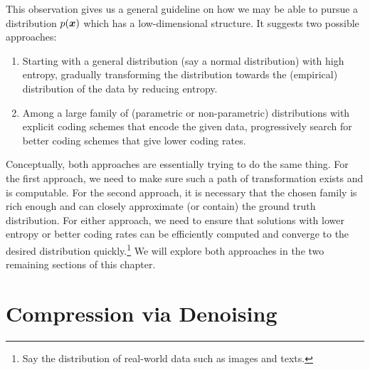 \documentclass[../../book-main.tex]{subfiles}
\begin{document}
This observation gives us a general guideline on how we may be able to pursue a distribution $p(\bm{x})$ which has a low-dimensional structure. It suggests two possible approaches:
\begin{enumerate}
	\item Starting with a general distribution (say a normal distribution) with high entropy, gradually transforming the distribution towards the (empirical) distribution of the data by reducing entropy.
	\item Among a large family of (parametric or non-parametric) distributions with explicit coding schemes that encode the given data, progressively search for better coding schemes that give lower coding rates.
\end{enumerate}
Conceptually, both approaches are essentially trying to do the same thing. For the first approach, we need to make sure such a path of transformation exists and is computable. For the second approach, it is necessary that the chosen family is rich enough and can closely approximate (or contain) the ground truth distribution. For either approach, we need to ensure that solutions with lower entropy or better coding rates can be efficiently computed and converge to the desired distribution quickly.\footnote{Say the distribution of real-world data such as images and texts.} We will explore both approaches in the two remaining sections of this chapter.  %

\section{Compression via Denoising}\label{sub:compression_denoising}
\end{document}
